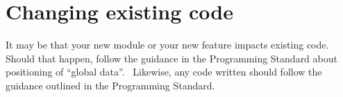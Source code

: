 \section{Changing existing code}\label{changing-existing-code}

It may be that your new module or your new feature impacts existing code.~ Should that happen, follow the guidance in the Programming Standard about positioning of ``global data''.~ Likewise, any code written should follow the guidance outlined in the Programming Standard.

